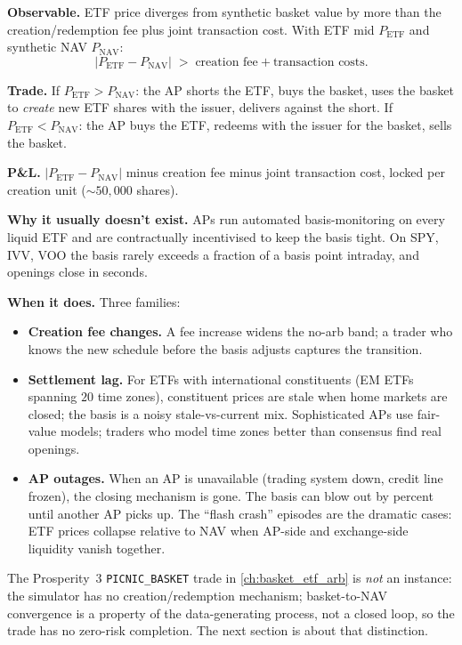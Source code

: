 \textbf{Observable.} ETF price diverges from synthetic basket
value by more than the creation/redemption fee plus joint
transaction cost. With ETF mid $P_{\text{ETF}}$ and synthetic
NAV $P_{\text{NAV}}$:
\begin{equation*}
  |P_{\text{ETF}} - P_{\text{NAV}}|
  \;>\;
  \text{creation fee} + \text{transaction costs}.
\end{equation*}

\textbf{Trade.} If $P_{\text{ETF}} > P_{\text{NAV}}$: the AP
shorts the ETF, buys the basket, uses the basket to
\emph{create} new ETF shares with the issuer, delivers against
the short. If $P_{\text{ETF}} < P_{\text{NAV}}$: the AP buys
the ETF, redeems with the issuer for the basket, sells the
basket.

\textbf{P\&L.} $|P_{\text{ETF}} - P_{\text{NAV}}|$ minus
creation fee minus joint transaction cost, locked per creation
unit ($\sim 50{,}000$ shares).

\textbf{Why it usually doesn't exist.} APs run automated
basis-monitoring on every liquid ETF and are contractually
incentivised to keep the basis tight. On SPY, IVV, VOO the
basis rarely exceeds a fraction of a basis point intraday, and
openings close in seconds.

\textbf{When it does.} Three families:
\begin{itemize}
  \item \textbf{Creation fee changes.} A fee increase widens the
  no-arb band; a trader who knows the new schedule before the
  basis adjusts captures the transition.
  \item \textbf{Settlement lag.} For ETFs with international
  constituents (EM ETFs spanning $20$ time zones), constituent
  prices are stale when home markets are closed; the basis is a
  noisy stale-vs-current mix. Sophisticated APs use fair-value
  models; traders who model time zones better than consensus
  find real openings.
  \item \textbf{AP outages.} When an AP is unavailable (trading
  system down, credit line frozen), the closing mechanism is
  gone. The basis can blow out by percent until another AP picks
  up. The ``flash crash'' episodes are the dramatic cases: ETF
  prices collapse relative to NAV when AP-side and exchange-side
  liquidity vanish together.
\end{itemize}

The Prosperity~$3$ \texttt{PICNIC\_BASKET} trade in
\cref{ch:basket_etf_arb} is \emph{not} an instance: the
simulator has no creation/redemption mechanism; basket-to-NAV
convergence is a property of the data-generating process, not a
closed loop, so the trade has no zero-risk completion. The next
section is about that distinction.

